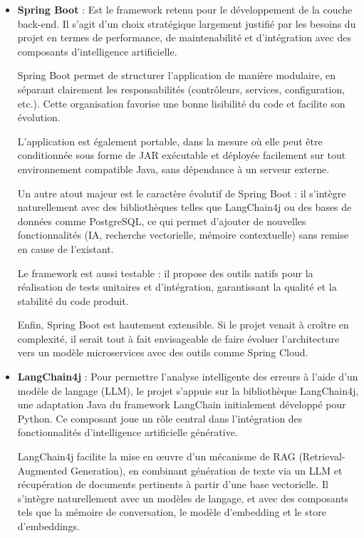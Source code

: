 \documentclass[12pt,a4paper]{report}
\begin{document}
	\begin{itemize}
		
		\item \textbf{Spring Boot} : Est le framework retenu pour le développement de la couche back-end. Il s’agit d’un choix stratégique largement justifié par les besoins du projet en termes de performance, de maintenabilité et d’intégration avec des composants d’intelligence artificielle.
		
		Spring Boot permet de structurer l’application de manière modulaire, en séparant clairement les responsabilités (contrôleurs, services, configuration, etc.). Cette organisation favorise une bonne lisibilité du code et facilite son évolution.
		
		L’application est également portable, dans la mesure où elle peut être conditionnée sous forme de JAR exécutable et déployée facilement sur tout environnement compatible Java, sans dépendance à un serveur externe.
		
		Un autre atout majeur est le caractère évolutif de Spring Boot : il s’intègre naturellement avec des bibliothèques telles que LangChain4j ou des bases de données comme PostgreSQL, ce qui permet d’ajouter de nouvelles fonctionnalités (IA, recherche vectorielle, mémoire contextuelle) sans remise en cause de l’existant.
		
		Le framework est aussi testable : il propose des outils natifs pour la réalisation de tests unitaires et d’intégration, garantissant la qualité et la stabilité du code produit.
		
		Enfin, Spring Boot est hautement extensible. Si le projet venait à croître en complexité, il serait tout à fait envisageable de faire évoluer l’architecture vers un modèle microservices avec des outils comme Spring Cloud.
		
		\item \textbf{LangChain4j} : Pour permettre l’analyse intelligente des erreurs à l’aide d’un modèle de langage (LLM), le projet s’appuie sur la bibliothèque LangChain4j, une adaptation Java du framework LangChain initialement développé pour Python. Ce composant joue un rôle central dans l’intégration des fonctionnalités d’intelligence artificielle générative.
		
		LangChain4j facilite la mise en œuvre d’un mécanisme de RAG (Retrieval-Augmented Generation), en combinant génération de texte via un LLM et récupération de documents pertinents à partir d’une base vectorielle. Il s’intègre naturellement avec un modèles de langage, et avec des composants tels que la mémoire de conversation, le modèle d’embedding et le store d’embeddings.
		

\end{itemize}
\end{document}
